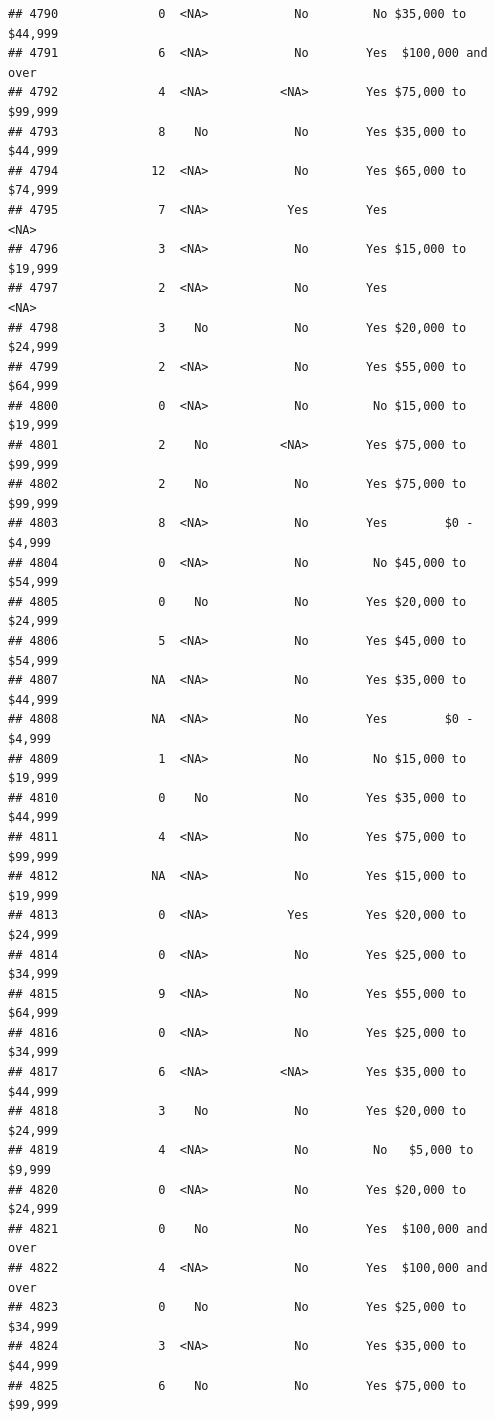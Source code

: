 \documentclass[man]{apa6}
\begin{document}
\begin{verbatim}
## 4790              0  <NA>            No         No $35,000 to $44,999
## 4791              6  <NA>            No        Yes  $100,000 and over
## 4792              4  <NA>          <NA>        Yes $75,000 to $99,999
## 4793              8    No            No        Yes $35,000 to $44,999
## 4794             12  <NA>            No        Yes $65,000 to $74,999
## 4795              7  <NA>           Yes        Yes               <NA>
## 4796              3  <NA>            No        Yes $15,000 to $19,999
## 4797              2  <NA>            No        Yes               <NA>
## 4798              3    No            No        Yes $20,000 to $24,999
## 4799              2  <NA>            No        Yes $55,000 to $64,999
## 4800              0  <NA>            No         No $15,000 to $19,999
## 4801              2    No          <NA>        Yes $75,000 to $99,999
## 4802              2    No            No        Yes $75,000 to $99,999
## 4803              8  <NA>            No        Yes        $0 - $4,999
## 4804              0  <NA>            No         No $45,000 to $54,999
## 4805              0    No            No        Yes $20,000 to $24,999
## 4806              5  <NA>            No        Yes $45,000 to $54,999
## 4807             NA  <NA>            No        Yes $35,000 to $44,999
## 4808             NA  <NA>            No        Yes        $0 - $4,999
## 4809              1  <NA>            No         No $15,000 to $19,999
## 4810              0    No            No        Yes $35,000 to $44,999
## 4811              4  <NA>            No        Yes $75,000 to $99,999
## 4812             NA  <NA>            No        Yes $15,000 to $19,999
## 4813              0  <NA>           Yes        Yes $20,000 to $24,999
## 4814              0  <NA>            No        Yes $25,000 to $34,999
## 4815              9  <NA>            No        Yes $55,000 to $64,999
## 4816              0  <NA>            No        Yes $25,000 to $34,999
## 4817              6  <NA>          <NA>        Yes $35,000 to $44,999
## 4818              3    No            No        Yes $20,000 to $24,999
## 4819              4  <NA>            No         No   $5,000 to $9,999
## 4820              0  <NA>            No        Yes $20,000 to $24,999
## 4821              0    No            No        Yes  $100,000 and over
## 4822              4  <NA>            No        Yes  $100,000 and over
## 4823              0    No            No        Yes $25,000 to $34,999
## 4824              3  <NA>            No        Yes $35,000 to $44,999
## 4825              6    No            No        Yes $75,000 to $99,999

\end{verbatim}
\end{document}
